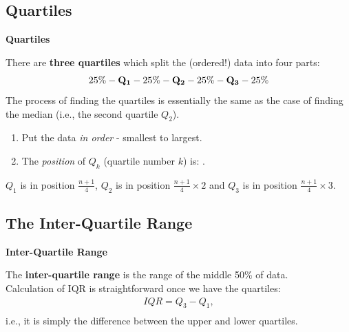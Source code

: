 \documentclass[compress]{beamer}        %
\makeatletter
\newcommand{\tcb}{\textcolor{beamer@blendedblue}}
\makeatother
\begin{document}
\subsection{Quartiles}
\begin{frame}{\bf \tcb{Quartiles}}

There are {\bf three quartiles} which split the (ordered!) data into four parts:\\[-0.4cm]
\begin{align*}
25\% - {\bf Q_1} - 25\% - {\bf Q_2} - 25\% - {\bf Q_3} - 25\%
\end{align*}
The process of finding the quartiles is essentially the same as the case of finding the median (i.e., the second quartile $Q_2$).\\[0.4cm]
\begin{enumerate}[1.]
\item Put the data \emph{in order} - smallest to largest.
\item The \emph{position} of $Q_k$ (quartile number $k$) is:
    .\\[0.6cm]
\end{enumerate}

$Q_1$ is in position $\tfrac{n+1}{4}$, $Q_2$ is in position $\tfrac{n+1}{4}\times2$ and $Q_3$ is in position $\tfrac{n+1}{4}\times3$.

\end{frame}


\subsection{The Inter-Quartile Range}
\begin{frame}{\bf \tcb{Inter-Quartile Range}}

The {\bf inter-quartile range} is the range of the middle 50\% of data.\\[1.2cm]

Calculation of IQR is straightforward once we have the quartiles:
\begin{align*}
\boxed{IQR = Q_3 - Q_1},\\[-0.1cm]
\end{align*}
i.e., it is simply the difference between the upper and lower quartiles.

\end{frame}
\end{document}
